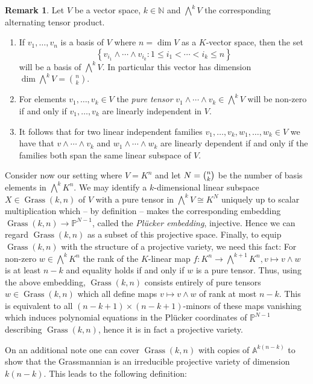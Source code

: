 \documentclass[
  paper=a4,
  titlepage,
  bibliography=totoc,
  listof=totoc,
  pagesize=pdftex
]{scrartcl}
\numberwithin{figure}{section}
\numberwithin{equation}{section}
\numberwithin{table}{section}
\newcommand*\setN{\mathds{N}}
\newcommand*\setA{\mathds{A}}
\newcommand*\setP{\mathds{P}}
\DeclareMathOperator{\Grass}{Grass}
\theoremstyle{definition}
\newtheorem{remark}[definition]{Remark}
\numberwithin{definition}{section}
\begin{document}
\begin{remark}
  Let $V$ be a vector space, $k \in \setN$ and $\bigwedge^k V$ the corresponding
  alternating tensor product.
  \begin{enumerate}
    \item If $v_1, \dots, v_n$ is a basis of $V$ where $n=\dim V$ as a $K$-vector space,
      then the set
      \[
        \left\{
          v_{i_1} \wedge \cdots \wedge v_{i_k} : 1\leq i_1 < \cdots < i_k \leq n
        \right\}
      \]
      will be a basis of $\bigwedge^kV$. In particular this vector has dimension
      $\dim\bigwedge^kV = \binom nk$.
    \item For elements $v_1, \dots, v_k \in V$ the \emph{pure tensor} $v_1\wedge \cdots
      \wedge v_k \in \bigwedge^kV$ will be non-zero if and only if $v_1, \dots, v_k$ are
      linearly independent in $V$.
    \item It follows that for two linear independent families $v_1, \dots, v_k, w_1,
      \dots, w_k \in V$ we have that $v\wedge\cdots \wedge v_k$ and $w_1\wedge\cdots\wedge
      w_k$ are linearly dependent if and only if the families both span the same linear
      subspace of $V$.
  \end{enumerate}
\end{remark}

Consider now our setting where $V=K^n$ and let $N = \smash{\binom nk}$ be the number of
basis elements in $\bigwedge^kK^n$. We may identify a $k$-dimensional linear subspace $X
\in \Grass(k,n)$ of $V$ with a pure tensor in $\bigwedge^kV \cong K^N$ uniquely up to
scalar multiplication which -- by definition -- makes the corresponding embedding
$\Grass(k,n) \to \setP^{N-1}$, called the \emph{Plücker embedding}, injective. Hence we
can regard $\Grass(k,n)$ as a subset of this projective space. Finally, to equip
$\Grass(k,n)$ with the structure of a projective variety, we need this fact: For non-zero
$w\in \bigwedge^kK^n$ the rank of the $K$-linear map $f:K^n \to \bigwedge^{k+1}K^n, v
\mapsto v \wedge w$ is at least $n-k$ and equality holds if and only if $w$ is a pure
tensor. Thus, using the above embedding, $\Grass(k,n)$ consists entirely of pure tensors
$w\in \Grass(k,n)$ which all define maps $v\mapsto v\wedge w$ of rank at most $n-k$. This
is equivalent to all $(n-k+1) \times (n-k+1)$-minors of these maps vanishing which induces
polynomial equations in the Plücker coordinates of $\setP^{N-1}$ describing $\Grass(k,n)$,
hence it is in fact a projective variety.

On an additional note one can cover $\Grass(k,n)$ with copies of $\setA^{k(n-k)}$ to show
that the Grassmannian is an irreducible projective variety of dimension $k(n-k)$. This
leads to the following definition:
\end{document}
